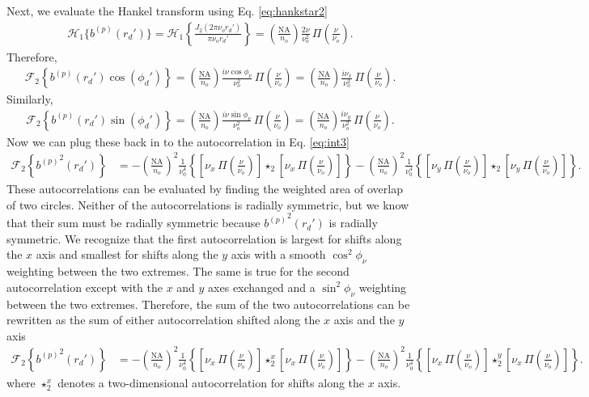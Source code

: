 \documentclass[11pt]{article}
\begin{document}
Next, we evaluate the Hankel transform using Eq. \ref{eq:hankstar2}
\begin{align}
  \mathcal{H}_{1}\{{b^{(p)}}(r_d')\} = \mathcal{H}_{1}\left\{\frac{J_{2}(2\pi \nu_or_d')}{\pi\nu_o r_d'}\right\} =
  \left(\frac{\text{NA}}{n_o}\right)\frac{2\nu}{\nu_o^{2}}\, \Pi\left(\frac{\nu}{\nu_o}\right).
\end{align}
Therefore, 
\begin{align}
  \mathcal{F}_2\left\{{b^{(p)}}(r_d')\cos(\phi_d')\right\} = \left(\frac{\text{NA}}{n_o}\right)\frac{i\nu\cos\phi_\nu}{\nu_o^2}\, \Pi\left(\frac{\nu}{\nu_o}\right) = \left(\frac{\text{NA}}{n_o}\right)\frac{i\nu_x}{\nu_o^2}\, \Pi\left(\frac{\nu}{\nu_o}\right).
\end{align}
Similarly,
\begin{align}
  \mathcal{F}_2\left\{{b^{(p)}}(r_d')\sin(\phi_d')\right\} = \left(\frac{\text{NA}}{n_o}\right)\frac{i\nu\sin\phi_\nu}{\nu_o^2}\, \Pi\left(\frac{\nu}{\nu_o}\right) = \left(\frac{\text{NA}}{n_o}\right)\frac{i\nu_y}{\nu_o^2}\, \Pi\left(\frac{\nu}{\nu_o}\right).  
\end{align}
Now we can plug these back in to the autocorrelation in Eq. \ref{eq:int3}
\begin{align}
    \mathcal{F}_2\left\{{b^{(p)}}^2(r_d')\right\} &= -\left(\frac{\text{NA}}{n_o}\right)^2\frac{1}{\nu_0^4}\left\{\left[\nu_x\, \Pi\left(\frac{\nu}{\nu_o}\right)\right] \star_2 \left[\nu_x\, \Pi\left(\frac{\nu}{\nu_o}\right)\right]\right\} - \left(\frac{\text{NA}}{n_o}\right)^2\frac{1}{\nu_0^4}\left\{\left[\nu_y\, \Pi\left(\frac{\nu}{\nu_o}\right)\right] \star_2 \left[\nu_y\, \Pi\left(\frac{\nu}{\nu_o}\right)\right]\right\}.\label{eq:auto}
\end{align}
These autocorrelations can be evaluated by finding the weighted area of overlap
of two circles. Neither of the autocorrelations is radially symmetric, but we
know that their sum must be radially symmetric because ${b^{(p)}}^2(r_d')$ is
radially symmetric. We recognize that the first autocorrelation is largest for
shifts along the $x$ axis and smallest for shifts along the $y$ axis with a
smooth $\cos^2\phi_\nu$ weighting between the two extremes. The same is true for
the second autocorrelation except with the $x$ and $y$ axes exchanged and a
$\sin^2\phi_\nu$ weighting between the two extremes. Therefore, the sum of the two
autocorrelations can be rewritten as the sum of either autocorrelation shifted along
the $x$ axis and the $y$ axis
\begin{align}
    \mathcal{F}_2\left\{{b^{(p)}}^2(r_d')\right\} &= -\left(\frac{\text{NA}}{n_o}\right)^2\frac{1}{\nu_0^4}\left\{\left[\nu_x\, \Pi\left(\frac{\nu}{\nu_o}\right)\right] \star_2^x \left[\nu_x\, \Pi\left(\frac{\nu}{\nu_o}\right)\right]\right\} - \left(\frac{\text{NA}}{n_o}\right)^2\frac{1}{\nu_0^4}\left\{\left[\nu_x\, \Pi\left(\frac{\nu}{\nu_o}\right)\right] \star_2^y \left[\nu_x\, \Pi\left(\frac{\nu}{\nu_o}\right)\right]\right\}.
\end{align}
where $\star_2^x$ denotes a two-dimensional autocorrelation for shifts along the
$x$ axis.
\end{document}
